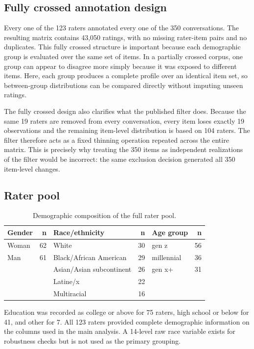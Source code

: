 \documentclass[11pt,a4paper]{article}
\begin{document}
\subsection{Fully crossed annotation design}

Every one of the 123 raters annotated every one of the 350 conversations. The resulting matrix
contains 43,050 ratings, with no missing rater-item pairs and no duplicates. This fully crossed
structure is important because each demographic group is evaluated over the same set of items. In
a partially crossed corpus, one group can appear to disagree more simply because it was exposed
to different items. Here, each group produces a complete profile over an identical item set, so
between-group distributions can be compared directly without imputing unseen ratings.

The fully crossed design also clarifies what the published filter does. Because the same 19
raters are removed from every conversation, every item loses exactly 19 observations and the
remaining item-level distribution is based on 104 raters. The filter therefore acts as a fixed
thinning operation repeated across the entire matrix. This is precisely why treating the 350
items as independent realizations of the filter would be incorrect: the same exclusion decision
generated all 350 item-level changes.

\subsection{Rater pool}

\begin{table}[htbp]
\centering
\caption{Demographic composition of the full rater pool.}
\label{tab:pool}
\small\begin{tabular}{lr@{\hskip 2em}lr@{\hskip 2em}lr}
\toprule
\textbf{Gender} & \textbf{n} & \textbf{Race/ethnicity} & \textbf{n} & \textbf{Age group} & \textbf{n} \\
\midrule
Woman & 62 & White & 30 & gen z & 56 \\
Man & 61 & Black/African American & 29 & millennial & 36 \\
 & & Asian/Asian subcontinent & 26 & gen x+ & 31 \\
 & & Latine/x & 22 & & \\
 & & Multiracial & 16 & & \\
\bottomrule
\end{tabular}
\end{table}

Education was recorded as college or above for 75 raters, high school or below for 41, and other
for 7. All 123 raters provided complete demographic information on the columns used in the main
analysis. A 14-level raw race variable exists for robustness checks but is not used as the primary
grouping.
\end{document}
